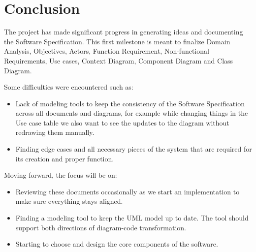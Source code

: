 \section{Conclusion} \label{conclusion}

The project has made significant progress in generating ideas and documenting the Software Specification. This first milestone is meant to finalize Domain Analysis, Objectives, Actors, Function Requirement, Non-functional Requirements, Use cases, Context Diagram, Component Diagram and Class Diagram.

Some difficulties were encountered such as:

\begin{itemize}
	\item Lack of modeling tools to keep the consistency of the Software Specification across all documents and diagrams, for example while changing things in the Use case table we also want to see the updates to the diagram without redrawing them manually.
	\item Finding edge cases and all necessary pieces of the system that are required for its creation and proper function.
\end{itemize}

Moving forward, the focus will be on:

\begin{itemize}
	\item Reviewing these documents occasionally as we start an implementation to make sure everything stays aligned.
	\item Finding a modeling tool to keep the UML model up to date. The tool should support both directions of diagram-code transformation.
	\item Starting to choose and design the core components of the software.
\end{itemize}